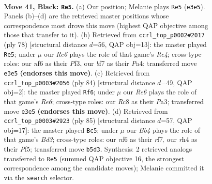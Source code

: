 \documentclass[11pt]{article}
\begin{document}
\clearpage

\begin{figure}[p]\centering
\begin{subfigure}{0.46\textwidth}\centering
\resizebox{\linewidth}{!}{%
\newchessgame
\chessboard[
  setfen={2r5/1k3B2/5N2/Rb3p2/7R/4r3/1P4P1/3KN3 b - - 0 41},
  showmover=false,
  pgfstyle=straightmove, color=movearrow, markmove={e3-e5}
]}
\caption{}
\end{subfigure}\hfill
\begin{subfigure}{0.46\textwidth}\centering
\resizebox{\linewidth}{!}{%
\newchessgame
\chessboard[
  setfen={8/1p3k2/4n3/1Nb4p/P3R2B/5P2/3r4/5K2 w - - 1 40},
  showmover=false,
  pgfstyle=straightmove, color=movearrow, markmove={e4-e5}
]}
\caption{}
\end{subfigure}
\\[4pt]
\begin{subfigure}{0.46\textwidth}\centering
\resizebox{\linewidth}{!}{%
\newchessgame
\chessboard[
  setfen={8/pp1k3B/4R3/8/6P1/P5n1/1r6/4K3 w - - 3 43},
  showmover=false,
  pgfstyle=straightmove, color=movearrow, markmove={e6-f6}
]}
\caption{}
\end{subfigure}\hfill
\begin{subfigure}{0.46\textwidth}\centering
\resizebox{\linewidth}{!}{%
\newchessgame
\chessboard[
  setfen={1k6/5R2/3b2p1/5p2/2N4r/3K3P/1P3P2/8 b - - 0 43},
  showmover=false,
  pgfstyle=straightmove, color=movearrow, markmove={d6-c5}
]}
\caption{}
\end{subfigure}
\caption{\textbf{Move 41, Black: \texttt{Re5}.} (a) Our position; Melanie plays \texttt{Re5} (\texttt{e3e5}). Panels (b)--(d) are the retrieved master positions whose correspondence most drove this move (highest QAP objective among those that transfer to it). (b) Retrieved from \texttt{ccrl\_top\_p0002\#2017} (ply 78) [structural distance $d$=56, QAP obj=13]: the master played \texttt{Re5}; under $\mu$ our \emph{Re6} plays the role of that game's \emph{Re4}; cross-type roles: our \emph{n}f6 as their \emph{P}f3, our \emph{b}f7 as their \emph{P}a4; transferred move \texttt{e3e5} \textbf{(endorses this move)}. (c) Retrieved from \texttt{ccrl\_top\_p0003\#2056} (ply 84) [structural distance $d$=49, QAP obj=2]: the master played \texttt{Rf6}; under $\mu$ our \emph{Re6} plays the role of that game's \emph{Re6}; cross-type roles: our \emph{R}c8 as their \emph{P}a3; transferred move \texttt{e3e5} \textbf{(endorses this move)}. (d) Retrieved from \texttt{ccrl\_top\_p0003\#2923} (ply 85) [structural distance $d$=57, QAP obj=17]: the master played \texttt{Bc5}; under $\mu$ our \emph{Bb4} plays the role of that game's \emph{Bd3}; cross-type roles: our \emph{n}f6 as their \emph{r}f7, our \emph{r}h4 as their \emph{P}f5; transferred move \texttt{b5d3}. Synthesis: 2 retrieved analogs transferred to \texttt{Re5} (summed QAP objective 16, the strongest correspondence among the candidate moves); Melanie committed it via the \texttt{search} selector.}
\label{fig:thought-m81}
\end{figure}
\end{document}
